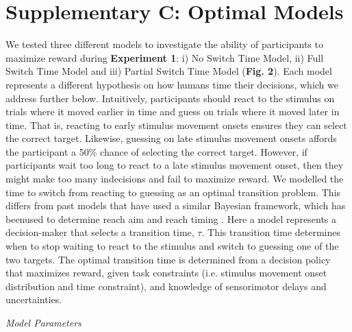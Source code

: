 \documentclass[man,floatsintext,letterpaper,12pt]{apa7}
\newcommand\boldblue[1]{\textcolor{mydarkblue}{\textbf{#1}}}
\begin{document}
\newpage
\section{Supplementary C: Optimal Models}
\vspace{-1mm}

\noindent We tested three different models to investigate the ability of participants to maximize reward during \boldblue{Experiment 1}: i) No Switch Time Model, ii) Full Switch Time Model and iii) Partial Switch Time Model (\boldblue{Fig. 2}). Each model represents a different hypothesis on how humans time their decisions, which we address further below. Intuitively, participants should react to the stimulus on trials where it moved earlier in time and guess on trials where it moved later in time. That is, reacting to early stimulus movement onsets ensures they can select the correct target. Likewise, guessing on late stimulus movement onsets affords the participant a 50\% chance of selecting the correct target. However, if participants wait too long to react to a late stimulus movement onset, then they might make too many indecisions and fail to maximize reward.
We modelled the time to switch from reacting to guessing as an optimal transition problem. This differs from past models that have used a similar Bayesian framework, which has beenused to determine reach aim \autocite{trommershauserStatisticalDecisionTheory2003} and reach timing \autocite{hudsonOptimalCompensationTemporal2008}. Here a model represents a decision-maker that selects a transition time, $\tau$. This transition time determines when to stop waiting to react to the stimulus and switch to guessing one of the two targets. The optimal transition time is determined from a decision policy that maximizes reward, given task constraints (i.e. stimulus movement onset distribution and time constraint), and knowledge of sensorimotor delays and uncertainties.

\vspace{2mm}
\noindent \emph{Model Parameters}
\end{document}
